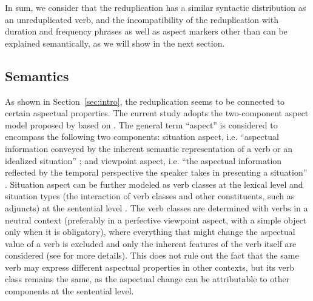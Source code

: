 \z\z


In sum, we consider that the reduplication has a similar syntactic distribution as an unreduplicated verb,
and the incompatibility of the reduplication with duration and frequency phrases 
as well as aspect markers other than  can be explained semantically, 
as we will show in the next section.

\subsection{Semantics}\label{sec:sem}

As shown in Section~\ref{sec:intro}, the reduplication seems to be connected to certain aspectual properties.
The current study adopts the two-component aspect model proposed by \citet{XiaoMcEnery2004} based on \citet{Smith1991}.
The general term ``aspect'' is considered to encompass the following two components:
situation aspect, i.e. ``aspectual information conveyed by the inherent semantic representation of a verb or an idealized situation'' \citep[21]{XiaoMcEnery2004};
and viewpoint aspect, i.e. ``the aspectual information reflected by the temporal perspective the speaker takes in presenting a situation'' \citep[21]{XiaoMcEnery2004}.
Situation aspect can be further modeled as verb classes  at the lexical level
and situation types (the interaction of verb classes and other constituents, such as adjuncts) at the sentential level \citep[33]{XiaoMcEnery2004}.
The verb classes are determined with verbs in a neutral context (preferably in a perfective viewpoint aspect, with a simple object only when it is obligatory),
where everything that might change the aspectual value of a verb is excluded
and only the inherent features of the verb itself are considered
(see \citealt[52]{XiaoMcEnery2004} for more details).
This does not rule out the fact that the same verb may express different aspectual properties in other contexts,
but its verb class remains the same,
as the aspectual change can be attributable to other components at the sentential level.

